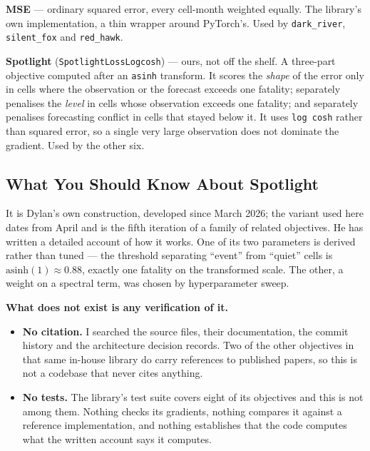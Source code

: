 
\textbf{MSE} --- ordinary squared error, every cell-month weighted equally. The library's own
implementation, a thin wrapper around PyTorch's. Used by \texttt{dark\_river}, \texttt{silent\_fox}
and \texttt{red\_hawk}.

\textbf{Spotlight} (\texttt{SpotlightLossLogcosh}) --- ours, not off the shelf. A three-part
objective computed after an \texttt{asinh} transform. It scores the \textit{shape} of the error only
in cells where the observation or the forecast exceeds one fatality; separately penalises the
\textit{level} in cells whose observation exceeds one fatality; and separately penalises
forecasting conflict in cells that stayed below it. It uses \texttt{log cosh} rather than squared
error, so a single very large observation does not dominate the gradient. Used by the other six.

\subsection*{What You Should Know About Spotlight}

It is Dylan's own construction, developed since March 2026; the variant used here dates from April
and is the fifth iteration of a family of related objectives. He has written a detailed account of
how it works. One of its two parameters is derived rather than tuned --- the threshold separating
``event'' from ``quiet'' cells is $\mathrm{asinh}(1) \approx 0.88$, exactly one fatality on the
transformed scale. The other, a weight on a spectral term, was chosen by hyperparameter sweep.

\textbf{What does not exist is any verification of it.}

\begin{itemize}
    \item \textbf{No citation.} I searched the source files, their documentation, the commit
          history and the architecture decision records. Two of the other objectives in that same
          in-house library do carry references to published papers, so this is not a codebase that
          never cites anything.
    \item \textbf{No tests.} The library's test suite covers eight of its objectives and this is
          not among them. Nothing checks its gradients, nothing compares it against a reference
          implementation, and nothing establishes that the code computes what the written account
          says it computes.
\end{itemize}

